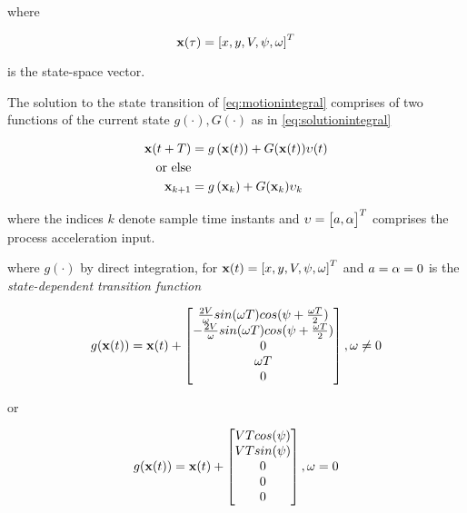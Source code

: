where 

\begin{equation}
\mathbf{x(\tau)} = \left[x,y,{V}, {\psi},\omega\right]^{T}
\end{equation}

is the state-space vector. 

The solution to the state transition of \cref{eq:motionintegral} comprises of two functions of the current state $g(\cdot), G(\cdot)$ as in \eqref{eq:solutionintegral}




\begin{align}\label{eq:solutionintegral}
\mathbf{x}(t+T) &= g\left(\mathbf{x}(t)\right)   + G(\mathbf{x}(t)){\upsilon}(t) \\
\textrm{or else} \nonumber\\
\mathbf{x}_{k+1} &= g\left(\mathbf{x}_k\right)   + G(\mathbf{x}_k){\upsilon}_k
\end{align}

where the indices $k$ denote sample time instants and  ${\upsilon} = \left[\begin{matrix}{a}, {\alpha}\end{matrix}\right]^T$ comprises the process acceleration input.

where $g(\cdot)$ by direct integration, for $\mathbf{x}(t) =\left[x,y,{V}, {\psi},\omega\right]^{T} $ and ${a}={\alpha}=0$ is the \emph{state-dependent transition function}

\begin{equation}
g(\mathbf{x}(t)) = \mathbf{x}(t) +  \begin{bmatrix}
\frac{2{V}}{\omega}sin(\omega T)cos({\psi} + \frac{\omega T}{2})\\
-\frac{2{V}}{\omega}sin(\omega T)cos({\psi} + \frac{\omega T}{2})\\
0 \\
\omega T \\
0
\end{bmatrix} , \omega \neq 0
\end{equation}

or


\begin{equation}
g(\mathbf{x}(t)) = \mathbf{x}(t) +  \begin{bmatrix}
{V} T cos({\psi})\\
{V} T sin({\psi})\\
0 \\
0 \\
0
\end{bmatrix} ,  \omega = 0
\end{equation}

